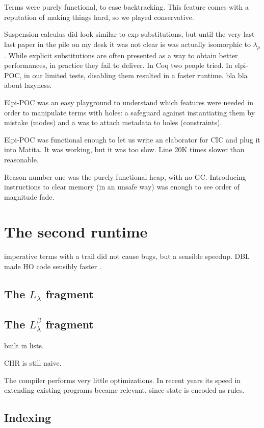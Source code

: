 \documentclass[a4paper, 11pt]{book}
\begin{document}
Terms were purely functional, to ease backtracking. This feature comes
with a reputation of making things hard, so we played conservative.

Suspension calculus did look similar to exp-substitutions, but until the very
last last paper in the pile on my desk it was not clear is was actually isomorphic
to $\lambda_\rho$. While explicit substitutions are often presented as a way to
obtain better performances, in practice they fail to deliver. In Coq two
people tried. In elpi-POC, in our limited tests, disabling them resulted in
a faster runtime.  bla bla about lazyness.

Elpi-POC was an easy playground to understand which features were needed in
order to manipulate terms with holes: a safeguard against instantiating them by
mistake (modes) and a was to attach metadata to holes (constraints).

Elpi-POC was functional enough to let us write an elaborator for CIC
and plug it into Matita. It was working, but it was too slow. Line 20K times
slower than reasonable.

Reason number one was the purely functional heap, with no GC. Introducing 
instructions to clear memory (in an unsafe way) was enough to see order of
magnitude fade.

\section{The second runtime}

imperative terms with a trail did not cause bugs, but a sensible speedup.
DBL made HO code sensibly faster \cite{dunchev15lpar}.

\subsection{The $L_{\lambda}$ fragment}
\subsection{The $L_{\lambda}^{\beta}$ fragment}

\cite{Michaylov1993HigherOrderLP}

built in lists.

CHR is still naive.

The compiler performs very little optimizations. In recent years its speed
in extending existing programs became relevant, since state is encoded as rules.

\subsection{Indexing}
\end{document}
